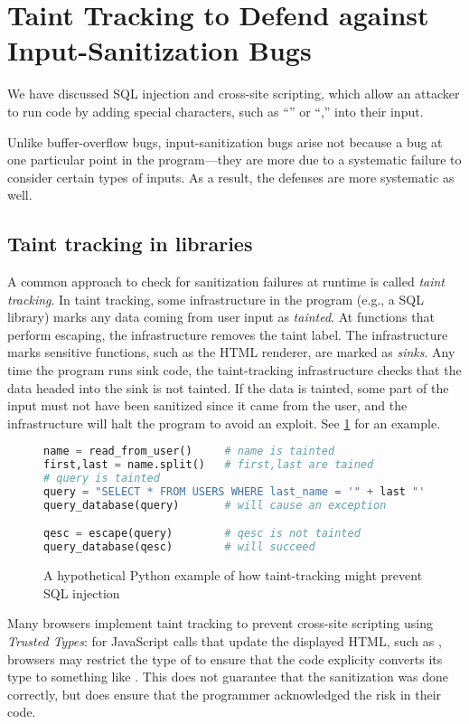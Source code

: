 \section{Taint Tracking to Defend against Input-Sanitization Bugs}
We have discussed SQL injection and cross-site scripting, which allow an attacker to run code by adding special characters, such as ``'' or ``\ttt{>},'' into their input.

Unlike buffer-overflow bugs, input-sanitization bugs arise not because a bug at one
particular point in the program---they are more due to a systematic failure to 
consider certain types of inputs.
As a result, the defenses are more systematic as well.

\subsection{Taint tracking in libraries}
A common approach to check for sanitization failures at runtime
is called \emph{taint tracking}.
In taint tracking, some infrastructure in the program (e.g., a SQL library) marks any data
coming from user input as \emph{tainted}.
At functions that perform escaping, the infrastructure removes the taint label.
The infrastructure marks sensitive functions, such as the HTML renderer, are marked as \emph{sinks}. 
Any time the program runs sink code, the taint-tracking infrastructure checks
that the data headed into the sink is not tainted.
If the data is tainted, some part of the input must not have been sanitized since it came from the user, and the infrastructure will halt the program to avoid an exploit.
See \cref{fig:taint} for an example.

\begin{figure}
\begin{lstlisting}[language=python]
name = read_from_user()     # name is tainted
first,last = name.split()   # first,last are tained
# query is tainted
query = "SELECT * FROM USERS WHERE last_name = '" + last "'"
query_database(query)       # will cause an exception

qesc = escape(query)        # qesc is not tainted
query_database(qesc)        # will succeed
\end{lstlisting}
  \caption{A hypothetical Python example of how taint-tracking might prevent
SQL injection}\label{fig:taint}
\end{figure}

Many browsers implement taint tracking to prevent cross-site scripting using \emph{Trusted Types}: for JavaScript calls that update the displayed HTML, such as , browsers may restrict the type of  to ensure that the code explicity converts its type to something like . This does not guarantee that the sanitization was done correctly, but does ensure that the programmer acknowledged the risk in their code.

